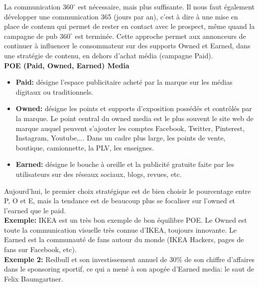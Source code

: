 La communication $360^{\circ}$ est nécessaire, mais plus suffisante. Il nous faut également développer une communication 365 (jours par an), c'est à dire à une mise en place de contenu qui permet de rester en contact avec le prospect, même quand la campagne de pub $360^{\circ}$ est terminée. Cette approche permet aux annonceurs de continuer à influencer le consommateur sur des supports Owned et Earned, dans une stratégie de contenu, en dehors d'achat média (campagne Paid).\\

\textbf{POE (Paid, Owned, Earned) Media}

\begin{itemize}
    \item \textbf{Paid:} désigne l'espace publicitaire acheté par la marque sur les médias digitaux ou traditionnels.
    \item \textbf{Owned:} désigne les points et supports d'exposition possédés et contrôlés par la marque. Le point central du owned media est le plus souvent le site web de marque auquel peuvent s'ajouter les comptes Facebook, Twitter, Pinterest, Instagram, Youtube,... Dans un cadre plus large, les points de vente, boutique, camionnette, la PLV, les enseignes.
    \item \textbf{Earned:} désigne le bouche à oreille et la publicité gratuite faite par les utilisateurs sur des réseaux sociaux, blogs, revues, etc.\\
\end{itemize}

Aujourd'hui, le premier choix stratégique est de bien choisir le pourcentage entre P, O et E, mais la tendance est de beaucoup plus se focaliser sur l'owned et l'earned que le paid. \\

\textbf{Exemple:} IKEA est un très bon exemple de bon équilibre POE. Le Owned est toute la communication visuelle très connue d'IKEA, toujours innovante. Le Earned est la communauté de fans autour du monde (IKEA Hackers, pages de fans sur Facebook, etc). \\

\textbf{Exemple 2:} Redbull et son investissement annuel de 30\% de son chiffre d'affaires dans le sponsoring sportif, ce qui a mené à son apogée d'Earned media: le saut de Felix Baumgartner.
